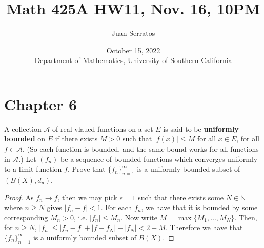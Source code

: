 \documentclass[oneside]{amsart}
\title{Math 425A HW11, Nov. 16, 10PM}
\author{Juan Serratos}
\date{October 15, 2022 \\ {Department of Mathematics, University of Southern California}}
\theoremstyle{definition}
\newcommand{\nn}{\mathbb N}
\begin{document}
\maketitle
\setcounter{tocdepth}{4}
\setcounter{secnumdepth}{4}
 \section{Chapter 6}
\begin{tcolorbox}[colback=black!5!white,colframe=black!75!black,title= Exercise $3.1.$]  A collection $\mathcal A$ of real-vlaued functions on a set $E$ is said to be \textbf{uniformly bounded} on $E$ if there exists $M > 0$ such that $|f(x)| \leq M$ for all $x \in E$, for all $f \in \mathcal A$. (So each function is bounded, and the same bound works for all functions in $\mathcal A$.) Let $(f_n)$ be a sequence of bounded functions which converges uniformly to a limit function $f$. Prove that $\{f_n \}_{n=1}^\infty$ is a uniformly bounded subset of $(B(X),d_u)$.
\tcblower 
\begin{proof} As $f_n \to f$, then we may pick $\epsilon = 1$ such that there exists some $N \in \nn$ where $n \geq N$ gives $|f_n - f| < 1$. For each $f_n$, we have that it is bounded by some corresponding $M_n > 0$, i.e. $|f_n| \leq M_n$. Now write $M = \max \{ M_1, \ldots, M_N\}$. Then, for $n \geq N$, $|f_n | \leq |f_n - f|+|f-f_N|+|f_N| < 2+M$. Therefore we have that $ \{ f_n \}_{n=1}^\infty$ is a uniformly bounded subset of $B(X)$.
\end{proof}
\end{tcolorbox}
\end{document}
